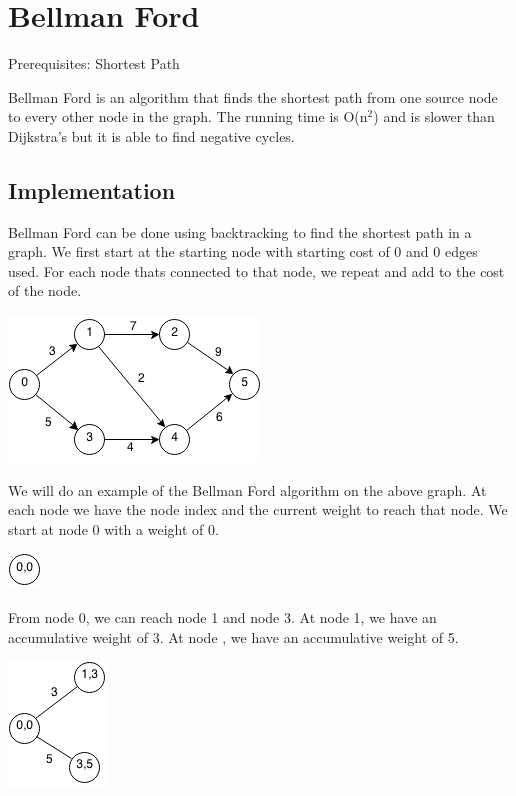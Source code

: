 \documentclass[11pt,oneside]{book}
\makeatletter
\def\maxwidth#1{\ifdim\Gin@nat@width>#1 #1\else\Gin@nat@width\fi}
\makeatother
\begin{document}
        \section{ Bellman Ford }
        

Prerequisites:  Shortest Path

Bellman Ford is an algorithm that finds the shortest path from one source node to every other node in the graph. The running time is O(n$^{2}$) and is slower than Dijkstra's but it is able to find negative cycles.

\subsection{Implementation}

Bellman Ford can be done using backtracking to find the shortest path in a graph. We first start at the starting node with starting cost of 0 and 0 edges used. For each node thats connected to that node, we repeat and add to the cost of the node.

\vspace{5px}\includegraphics[width=\maxwidth{\textwidth}]{bellmanford.png}

We will do an example of the Bellman Ford algorithm on the above graph. At each node we have the node index and the current weight to reach that node. We start at node 0 with a weight of 0.

\vspace{5px}\includegraphics[width=\maxwidth{\textwidth}]{bellmanford2.png}

From node 0, we can reach node 1 and node 3. At node 1, we have an accumulative weight of 3. At node , we have an accumulative weight of 5.

\vspace{5px}\includegraphics[width=\maxwidth{\textwidth}]{bellmanford3.png}
\end{document}

